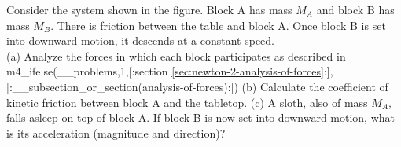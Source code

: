 Consider the system shown in the figure. Block A has mass $M_A$
and block B has mass $M_B$. There is friction between the table 
and block A. Once block B is set into downward motion, it
descends at a constant speed.\\
%
(a) Analyze the forces in which each block participates as described
in m4_ifelse(__problems,1,[:section \ref{sec:newton-2-analysis-of-forces}:],[:__subsection_or_section(analysis-of-forces):])\hwendpart
%
(b) Calculate the coefficient of kinetic friction between block A and
the tabletop.\answercheck\hwendpart
%
(c) A sloth, also of mass $M_A$, falls asleep on top of block A. If
block B is now set into downward motion, what is its acceleration
(magnitude and direction)?\answercheck
